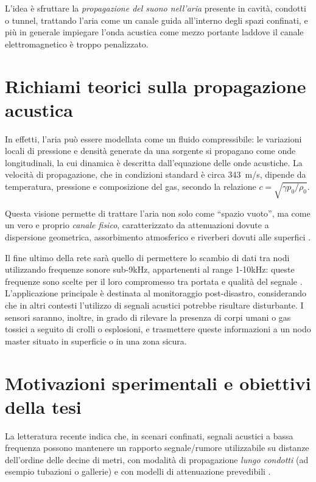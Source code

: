 L’idea è sfruttare la \emph{propagazione del suono nell’aria} presente in cavità, condotti o tunnel, trattando l’aria 
come un canale guida all'interno degli spazi confinati, e più in generale impiegare l’onda acustica come 
mezzo portante laddove il canale elettromagnetico è troppo penalizzato. 

\section{Richiami teorici sulla propagazione acustica}
In effetti, l’aria può essere modellata come un fluido compressibile: le variazioni locali di pressione e densità generate da una sorgente si propagano come onde longitudinali, 
la cui dinamica è descritta dall’equazione delle onde acustiche. 
La velocità di propagazione, che in condizioni standard 
è circa \SI{343}{m/s}, dipende da temperatura, pressione e composizione del gas, secondo la relazione 
$c = \sqrt{\gamma p_0 / \rho_0}$. 

Questa visione permette di trattare l’aria non solo come “spazio vuoto”, ma come un 
vero e proprio \emph{canale fisico}, caratterizzato da attenuazioni dovute a dispersione geometrica, assorbimento atmosferico 
e riverberi dovuti alle superfici \cite{Kinsler,MorseIngard,Pierce}. 

Il fine ultimo della rete sarà quello di permettere lo scambio di dati tra nodi utilizzando frequenze sonore sub-9kHz, appartenenti al range 1-10kHz: 
queste frequenze sono scelte per il loro compromesso tra portata e qualità del segnale \cite{Heifetz2017ANL}. 
L'applicazione principale è destinata al monitoraggio post-disastro, considerando che in altri contesti l'utilizzo di segnali acustici potrebbe risultare disturbante. 
I sensori saranno, inoltre, in grado di rilevare la presenza di corpi umani o gas tossici a seguito di crolli o esplosioni,
e trasmettere queste informazioni a un nodo master situato in superficie o in una zona sicura. 

\section{Motivazioni sperimentali e obiettivi della tesi}
La letteratura recente indica che, in scenari confinati, segnali acustici a bassa frequenza possono mantenere 
un rapporto segnale/rumore utilizzabile su distanze dell'ordine delle decine di metri, con modalità di propagazione 
\emph{lungo condotti} (ad esempio tubazioni o gallerie) e con modelli di attenuazione prevedibili 
\cite{acoustic2024}.  

